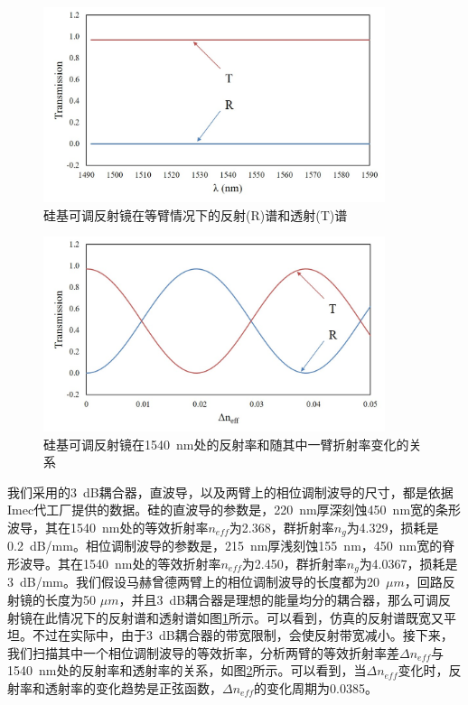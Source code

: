 \begin{figure}[htb]
	\centering
	\includegraphics[width=10cm]{./Pictures/chapt5_tunable_reflection_mirror_spec.jpg}
	\caption{硅基可调反射镜在等臂情况下的反射(R)谱和透射(T)谱}
	\label{chapt5_tunable_reflection_mirror_spec}
\end{figure}
\begin{figure}[htb]
	\centering
	\includegraphics[width=10cm]{./Pictures/chapt5_tunable_reflection_mirror_spec_single.jpg}
	\caption{硅基可调反射镜在1540~nm处的反射率和随其中一臂折射率变化的关系}
	\label{chapt5_tunable_reflection_mirror_spec_single}
\end{figure}
我们采用的3~dB耦合器，直波导，以及两臂上的相位调制波导的尺寸，都是依据Imec代工厂提供的数据\cite{Imec}。硅的直波导的参数是，220~nm厚深刻蚀450~nm宽的条形波导，其在1540~nm处的等效折射率$n_{eff}$为2.368，群折射率$n_{g}$为4.329，损耗是0.2~dB/mm。相位调制波导的参数是，215~nm厚浅刻蚀155~nm，450~nm宽的脊形波导。其在1540~nm处的等效折射率$n_{eff}$为2.450，群折射率$n_{g}$为4.0367，损耗是3~dB/mm。我们假设马赫曾德两臂上的相位调制波导的长度都为20~$\mu m$，回路反射镜的长度为50 $\mu m$，并且3~dB耦合器是理想的能量均分的耦合器，那么可调反射镜在此情况下的反射谱和透射谱如图\ref{chapt5_tunable_reflection_mirror_spec}所示。可以看到，仿真的反射谱既宽又平坦。不过在实际中，由于3~dB耦合器的带宽限制，会使反射带宽减小。接下来，我们扫描其中一个相位调制波导的等效折率，分析两臂的等效折射率差$\Delta n_{eff}$与1540~nm处的反射率和透射率的关系，如图\ref{chapt5_tunable_reflection_mirror_spec_single}所示。可以看到，当$\Delta n_{eff}$变化时，反射率和透射率的变化趋势是正弦函数，$\Delta n_{eff}$的变化周期为0.0385。

